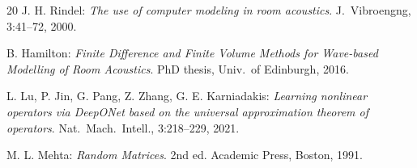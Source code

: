 ﻿\documentclass[12pt, a4paper]{article}
\theoremstyle{definition}
\theoremstyle{remark}
\begin{document}
\begin{thebibliography}{20}
  J. H. Rindel:
  \textit{The use of computer modeling in room acoustics}.
  J.\ Vibroengng, 3:41--72, 2000.

  B. Hamilton:
  \textit{Finite Difference and Finite Volume Methods for Wave-based Modelling
  of Room Acoustics}.
  PhD thesis, Univ.\ of Edinburgh, 2016.

  L. Lu, P. Jin, G. Pang, Z. Zhang, G. E. Karniadakis:
  \textit{Learning nonlinear operators via DeepONet based on the universal
  approximation theorem of operators}.
  Nat.\ Mach.\ Intell., 3:218--229, 2021.

  M. L. Mehta:
  \textit{Random Matrices}. 2nd ed.
  Academic Press, Boston, 1991.

\end{thebibliography}
\end{document}
